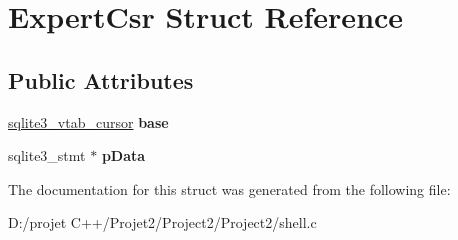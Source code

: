 \hypertarget{struct_expert_csr}{}\section{Expert\+Csr Struct Reference}
\label{struct_expert_csr}
\subsection*{Public Attributes}
\begin{DoxyCompactItemize}
\item 
\mbox{\label{struct_expert_csr_a646bf2fe1e9f4e0f812757a64363e36f}} 
\mbox{\hyperlink{structsqlite3__vtab__cursor}{sqlite3\+\_\+vtab\+\_\+cursor}} {\bfseries base}
\item 
\mbox{\label{struct_expert_csr_a852456ca0fb319cb3057d6926d9731d4}} 
sqlite3\+\_\+stmt $\ast$ {\bfseries p\+Data}
\end{DoxyCompactItemize}


The documentation for this struct was generated from the following file\+:\begin{DoxyCompactItemize}
\item 
D\+:/projet C++/\+Projet2/\+Project2/\+Project2/shell.\+c\end{DoxyCompactItemize}
